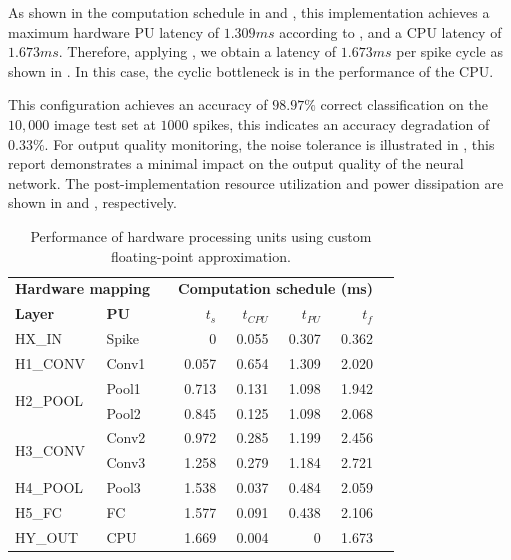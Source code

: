 As shown in the computation schedule in  and , this implementation achieves a maximum hardware PU latency of $1.309 ms$ according to , and a CPU latency of $1.673 ms$. Therefore, applying , we obtain a latency of $1.673 ms$ per spike cycle as shown in . In this case, the cyclic bottleneck is in the performance of the CPU.

This configuration achieves an accuracy of $98.97\%$ correct classification on the $10,000$ image test set at $1000$ spikes, this indicates an accuracy degradation of $0.33\%$. For output quality monitoring, the noise tolerance is illustrated in , this report demonstrates a minimal impact on the output quality of the neural network. The post-implementation resource utilization and power dissipation are shown in  and , respectively.

\begin{table}[t!]\centering
	\caption{Performance of hardware processing units using custom floating-point approximation.}\label{tab:latency_cfp}
	\scriptsize
	\begin{tabular}{llrrrrrr}\toprule
		\multicolumn{2}{c}{\textbf{Hardware mapping}} & &\multicolumn{4}{c}{\textbf{Computation schedule (ms)}} \\\cmidrule{1-2}\cmidrule{4-7}
		\textbf{Layer} &\textbf{PU} & &$t_s$ &$t_{CPU}$ &$t_{PU}$ &$t_f$ \\\midrule
		HX\_IN &Spike & &0 &0.055 &0.307 &0.362 \\
		H1\_CONV &Conv1 & &0.057 &0.654 &1.309 &2.020 \\
		\multirow{2}{*}{H2\_POOL} &Pool1 & &0.713 &0.131 &1.098 &1.942 \\
		&Pool2 & &0.845 &0.125 &1.098 &2.068 \\
		\multirow{2}{*}{H3\_CONV} &Conv2 & &0.972 &0.285 &1.199 &2.456 \\
		&Conv3 & &1.258 &0.279 &1.184 &2.721 \\
		H4\_POOL &Pool3 & &1.538 &0.037 &0.484 &2.059 \\
		H5\_FC &FC & &1.577 &0.091 &0.438 &2.106 \\
		HY\_OUT &CPU & &1.669 &0.004 &0 &1.673 \\
		\bottomrule
	\end{tabular}
\end{table}

